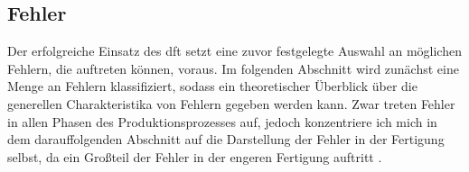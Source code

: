 \subsection{Fehler}
    Der erfolgreiche Einsatz des \ac{dft} setzt eine zuvor festgelegte Auswahl an möglichen Fehlern, die auftreten können, voraus.
    Im folgenden Abschnitt wird zunächst eine Menge an Fehlern klassifiziert, sodass ein theoretischer Überblick über die generellen Charakteristika von Fehlern gegeben werden kann.
    Zwar treten Fehler in allen Phasen des Produktionsprozesses auf, jedoch konzentriere ich mich in dem darauffolgenden Abschnitt auf die Darstellung der Fehler in der Fertigung selbst, da ein Großteil der Fehler in der engeren Fertigung auftritt \cite{karger_pruftechnik_1985}.